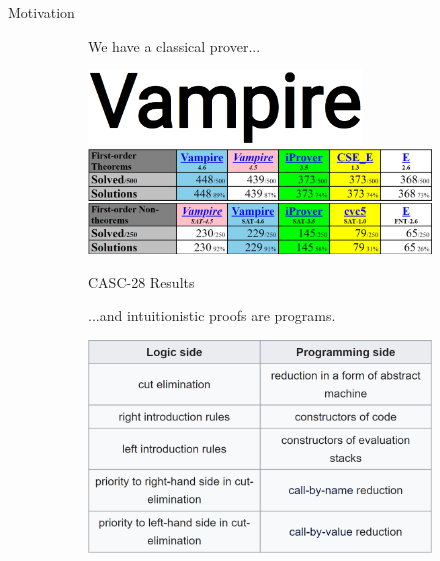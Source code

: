 \documentclass{cubeamer}
\begin{document}
	\begin{frame}{Motivation}		
		\begin{figure}[!tbp]
			\begin{subfigure}[t]{0.48\textwidth}
				\noindent We have a {\color{red}classical} prover...
				\begin{center}
					\includegraphics[width=0.8\textwidth]{Vampire.png}
					\includegraphics[width=\textwidth]{CASC.png}
					\caption{CASC-28 Results}
				\end{center}
				\vfill
			\end{subfigure}
			\begin{subfigure}[t]{0.48\textwidth}
				\hfill...and {\color{red}intuitionistic} proofs are programs.
				\begin{center}
					\includegraphics[width=\textwidth]{proofs_as_programs.png}
				\end{center}
				\vfill
			\end{subfigure}
		\end{figure}
	\end{frame}
\end{document}
